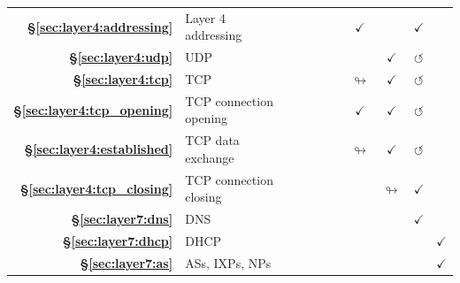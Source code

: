 {\begin{tabular}{rl ccccccccc}
    \textbf{\S\ref{sec:layer4:addressing}}  & Layer 4 addressing                               &                   &                    &                    &                    &                    & $\checkmark$         &                         & $\checkmark$         &                      \\
    \rowcolor{color1!15!white}
    \textbf{\S\ref{sec:layer4:udp}}  & UDP                                              &                   &                    &                    &                    &                    &                      & $\checkmark$            & $\circlearrowleft$   &                      \\
    \textbf{\S\ref{sec:layer4:tcp}}  & TCP                                              &                   &                    &                    &                    &                    & $\looparrowright$    & $\checkmark$            & $\circlearrowleft$   &                      \\
    \rowcolor{color1!15!white}
    \textbf{\S\ref{sec:layer4:tcp_opening}}  & TCP connection opening                           &                   &                    &                    &                    &                    & $\checkmark$         & $\checkmark$            & $\circlearrowleft$   &                      \\
    \textbf{\S\ref{sec:layer4:established}}  & TCP data exchange                                &                   &                    &                    &                    &                    & $\looparrowright$    & $\checkmark$            & $\circlearrowleft$   &                      \\
    \rowcolor{color1!15!white}
    \textbf{\S\ref{sec:layer4:tcp_closing}}  & TCP connection closing                           &                   &                    &                    &                    &                    &                      & $\looparrowright$       & $\checkmark$         &                      \\
    \textbf{\S\ref{sec:layer7:dns}} & DNS                                              &                   &                    &                    &                    &                    &                      &                         & $\checkmark$         &                      \\
    \rowcolor{color1!15!white}
    \textbf{\S\ref{sec:layer7:dhcp}} & DHCP                                             &                   &                    &                    &                    &                    &                      &                         &                      & $\checkmark$         \\
    \textbf{\S\ref{sec:layer7:as}} & ASs, IXPs, NPs                                   &                   &                    &                    &                    &                    &                      &                         &                      & $\checkmark$         \\
\end{tabular}
}
